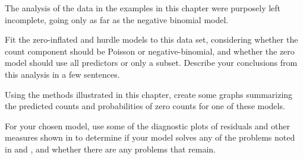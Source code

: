 \documentclass[11pt]{book}\usepackage[]{graphicx}\usepackage[]{color}
\begin{document}
\begin{Exercises}
  \exercise The analysis of the  data in the examples in this chapter were purposely left incomplete,
  going only as far as the negative binomial model.
  \begin{enumerate*}
    \item Fit the zero-inflated and hurdle models to this data set, considering whether the count component should
    be Poisson or negative-binomial, and whether the zero model should use all predictors or only a subset.
    Describe your conclusions from this analysis in a few sentences.
    \item Using the methods illustrated in this chapter, create some graphs summarizing the predicted counts
    and probabilities of zero counts for one of these models.
    \item For your chosen model, use some of the diagnostic plots of residuals and other measures shown in 
     to determine if your model solves any of the problems noted in 
    and , and whether there are any problems that remain.
  \end{enumerate*}
\end{Exercises}
\end{document}
